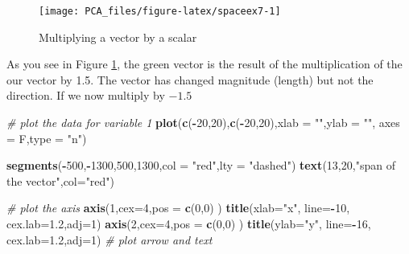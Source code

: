 \documentclass[
]{book}
\newenvironment{Shaded}{\begin{snugshade}}{\end{snugshade}}
\newcommand{\CommentTok}[1]{\textcolor[rgb]{0.56,0.35,0.01}{\textit{#1}}}
\newcommand{\DataTypeTok}[1]{\textcolor[rgb]{0.13,0.29,0.53}{#1}}
\newcommand{\DecValTok}[1]{\textcolor[rgb]{0.00,0.00,0.81}{#1}}
\newcommand{\FloatTok}[1]{\textcolor[rgb]{0.00,0.00,0.81}{#1}}
\newcommand{\KeywordTok}[1]{\textcolor[rgb]{0.13,0.29,0.53}{\textbf{#1}}}
\newcommand{\NormalTok}[1]{#1}
\newcommand{\OperatorTok}[1]{\textcolor[rgb]{0.81,0.36,0.00}{\textbf{#1}}}
\newcommand{\StringTok}[1]{\textcolor[rgb]{0.31,0.60,0.02}{#1}}
\theoremstyle{definition}
\theoremstyle{definition}
\theoremstyle{definition}
\theoremstyle{remark}
\begin{document}
\begin{figure}

{\centering \texttt{[image: PCA\_files/figure-latex/spaceex7-1]} 

}

\caption{Multiplying a vector by a scalar}\label{fig:spaceex7}
\end{figure}

As you see in Figure \ref{fig:spaceex7}, the green vector is the result of the multiplication of the our vector by 1.5. The vector has changed magnitude (length) but not the direction. If we now multiply by \(-1.5\)

\begin{Shaded}
\begin{Highlighting}[]
\CommentTok{# plot the data for variable 1}
\KeywordTok{plot}\NormalTok{(}\KeywordTok{c}\NormalTok{(}\OperatorTok{-}\DecValTok{20}\NormalTok{,}\DecValTok{20}\NormalTok{),}\KeywordTok{c}\NormalTok{(}\OperatorTok{-}\DecValTok{20}\NormalTok{,}\DecValTok{20}\NormalTok{),}\DataTypeTok{xlab =} \StringTok{""}\NormalTok{,}\DataTypeTok{ylab =} \StringTok{""}\NormalTok{,}
 \DataTypeTok{axes =}\NormalTok{ F,}\DataTypeTok{type =} \StringTok{"n"}\NormalTok{)}

\KeywordTok{segments}\NormalTok{(}\OperatorTok{-}\DecValTok{500}\NormalTok{,}\OperatorTok{-}\DecValTok{1300}\NormalTok{,}\DecValTok{500}\NormalTok{,}\DecValTok{1300}\NormalTok{,}\DataTypeTok{col =} \StringTok{"red"}\NormalTok{,}\DataTypeTok{lty =} \StringTok{"dashed"}\NormalTok{)}
\KeywordTok{text}\NormalTok{(}\DecValTok{13}\NormalTok{,}\DecValTok{20}\NormalTok{,}\StringTok{"span of the vector"}\NormalTok{,}\DataTypeTok{col=}\StringTok{"red"}\NormalTok{)}


\CommentTok{# plot the axis}
\KeywordTok{axis}\NormalTok{(}\DecValTok{1}\NormalTok{,}\DataTypeTok{cex=}\DecValTok{4}\NormalTok{,}\DataTypeTok{pos =} \KeywordTok{c}\NormalTok{(}\DecValTok{0}\NormalTok{,}\DecValTok{0}\NormalTok{) )}
\KeywordTok{title}\NormalTok{(}\DataTypeTok{xlab=}\StringTok{"x"}\NormalTok{, }\DataTypeTok{line=}\OperatorTok{-}\DecValTok{10}\NormalTok{, }\DataTypeTok{cex.lab=}\FloatTok{1.2}\NormalTok{,}\DataTypeTok{adj=}\DecValTok{1}\NormalTok{)}
\KeywordTok{axis}\NormalTok{(}\DecValTok{2}\NormalTok{,}\DataTypeTok{cex=}\DecValTok{4}\NormalTok{,}\DataTypeTok{pos =} \KeywordTok{c}\NormalTok{(}\DecValTok{0}\NormalTok{,}\DecValTok{0}\NormalTok{) )}
\KeywordTok{title}\NormalTok{(}\DataTypeTok{ylab=}\StringTok{"y"}\NormalTok{, }\DataTypeTok{line=}\OperatorTok{-}\DecValTok{16}\NormalTok{, }\DataTypeTok{cex.lab=}\FloatTok{1.2}\NormalTok{,}\DataTypeTok{adj=}\DecValTok{1}\NormalTok{)}
\CommentTok{# plot arrow and text}


\end{Highlighting}
\end{Shaded}
\end{document}
